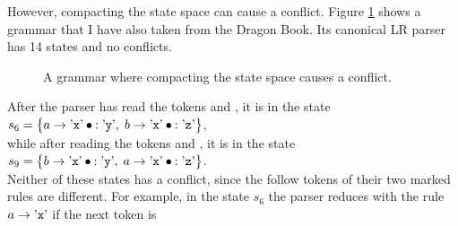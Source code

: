 However, compacting the state space can cause a conflict.  Figure \ref{fig:compacting-conflict.g} shows a grammar that
I have also taken from the Dragon Book.  Its canonical LR parser has 14 states and no conflicts.
\begin{figure}[htbp]
  \begin{center}
  \vspace*{-0.3cm}

  \end{center}
  \caption{A grammar where compacting the state space causes a conflict.}
  \label{fig:compacting-conflict.g}
\end{figure}
After the parser has read the tokens  and , it is in the state
\\[0.2cm]
\hspace*{1.3cm}
$s_6 = \bigl\{ a \rightarrow \saquoted{x} \mdot: \saquoted{y},\;
               b \rightarrow \saquoted{x} \mdot: \saquoted{z} \bigr\}$,
\\[0.2cm]
while after reading the tokens  and , it is in the state
\\[0.2cm]
\hspace*{1.3cm}
$s_9 = \bigl\{ b \rightarrow \saquoted{x} \mdot: \saquoted{y},\;
               a \rightarrow \saquoted{x} \mdot: \saquoted{z} \bigr\}$.
\\[0.2cm]
Neither of these states has a conflict, since the follow tokens of their two marked rules are different.  For
example, in the state $s_6$ the parser reduces with the rule $a \rightarrow \mbox{'\texttt{x}'}$ if the next token is
